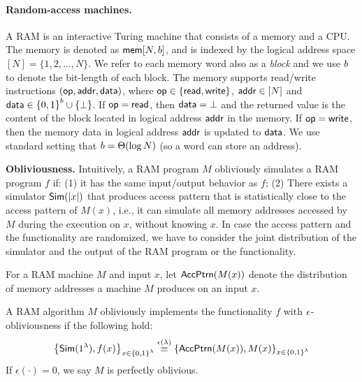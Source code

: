 \paragraph{Random-access machines.}
A RAM is an interactive Turing machine that consists of a memory and a CPU.  The
memory is denoted as ${\mathsf{mem}}[{N},{b}]$, and is indexed by the logical
address space $[N] = \{1,2,\ldots,N\}$. We refer to each memory word also as a
\emph{block} and we use $b$ to denote the bit-length of each block. The memory supports read/write
instructions $(\mathsf{op},{\mathsf{addr}}, {\mathsf{data}})$, where $\mathsf{op} \in \{{\mathsf{read}},{\mathsf{write}}\}$, ${\mathsf{addr}} \in
[N]$ and ${\mathsf{data}} \in {\{0,1\}}^{b} \cup \{\bot\}$.  If $\mathsf{op} = {\mathsf{read}}$, then
${\mathsf{data}}=\bot$ and the returned value is the content of the block located in
logical address ${\mathsf{addr}}$ in the memory. If $\mathsf{op}={\mathsf{write}}$, then the memory data in
logical address ${\mathsf{addr}}$ is updated to ${\mathsf{data}}$.
We use standard setting that ${b} = \Theta(\log N)$ (so a word can 
store an address).

\medskip
\noindent
{\bf Obliviousness.}
Intuitively, a RAM program $M$ obliviously simulates a RAM program $f$ if: (1) it has the same input/output behavior as $f$; (2) There exists a simulator ${\sf Sim}(\lvert x\rvert)$ that produces access pattern that is statistically close to the access pattern of $M(x)$, i.e., it can simulate all memory addresses accessed by $M$ during the execution on $x$, without knowing $x$. In case the access pattern and the functionality are randomized, we have to consider the joint distribution of the simulator and the output of the RAM program or the functionality. 


For a  RAM machine $M$ and input $x$, let ${\sf AccPtrn}(M(x))$ denote the distribution of memory addresses a machine $M$ produces on an input $x$.
\begin{definition}
A RAM algorithm $M$ obliviously implements the functionality $f$ with ${\epsilon}$-obliviousness if the following hold:
\begin{eqnarray*}
\left\{{\sf Sim}(1^\lambda),f(x)\right\}_{x \in {\{0,1\}}^\lambda} \overset{\epsilon(\lambda)}{\equiv} \left\{ {\sf AccPtrn}(M(x)),M(x)\right\}_{x \in {\{0,1\}}^\lambda}
\end{eqnarray*}
If $\epsilon(\cdot)=0$, we say $M$ is perfectly oblivious. 
\end{definition}

